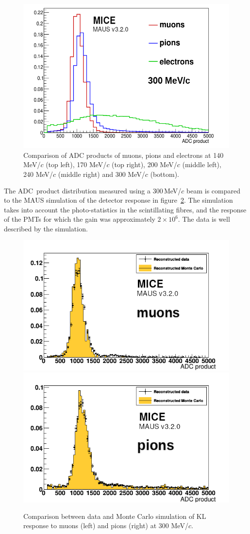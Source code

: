 \begin{figure}
\begin{center}
    \includegraphics[width=0.45\columnwidth]{./04-KL/Figures/mu_vs_pi_vs_e_300MEV-edited.png}
  \end{center}
  \caption{
    Comparison of ADC products of muons, pions and electrons at 140
    MeV/$c$ (top left), 170 MeV/$c$ (top right), 200 MeV/$c$ (middle
    left), 240 MeV/$c$ (middle right) and 300 MeV/$c$ (bottom).
  }
  \label{fig:KL4}
\end{figure}

The ADC~product distribution measured using a 300\,MeV/$c$ beam is
compared to the MAUS simulation of the detector response in
figure~\ref{fig:KL_mc_vs_data}.
The simulation takes into account the photo-statistics in the
scintillating fibres, and the response of the PMTs for which the gain was
approximately $2 \times 10^6$. 
The data is well described by the simulation.
\begin{figure}
  \begin{center}
    \includegraphics[width=0.4\columnwidth]{./04-KL/Figures/muon_mc_vs_data_edited.png}
    \includegraphics[width=0.4\columnwidth]{./04-KL/Figures/pion_mc_vs_data_edited.png}
  \end{center}
  \caption{
    Comparison between data and Monte Carlo simulation of KL response
    to muons (left) and pions (right) at 300 MeV/$c$.
  } 
  \label{fig:KL_mc_vs_data}
\end{figure}
